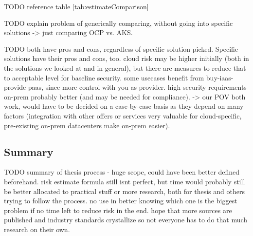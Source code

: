 TODO reference table \ref{tab:estimateComparison}

TODO explain problem of generically comparing, without going into specific solutions -> just comparing OCP vs. AKS.

TODO both have pros and cons, regardless of specific solution picked.  Specific solutions have their pros and cons, too. cloud risk may be higher initially (both in the solutions we looked at and in general), but there are measures to reduce that to acceptable level for baseline security. some usecases benefit from buy-iaas-provide-paas, since more control with you as provider. high-security requirements on-prem probably better (and may be needed for compliance). -> our POV both work, would have to be decided on a case-by-case basis as they depend on many factors (integration with other offers or services very valuable for cloud-specific, pre-existing on-prem datacenters make on-prem easier).


\subsection{Summary}

TODO summary of thesis process - huge scope, could have been better defined beforehand. risk estimate formula still isnt perfect, but time would probably still be better allocated to practical stuff or more research, both for thesis and others trying to follow the process. no use in better knowing which one is the biggest problem if no time left to reduce risk in the end. hope that more sources are published and industry standards crystallize so not everyone has to do that much research on their own.

